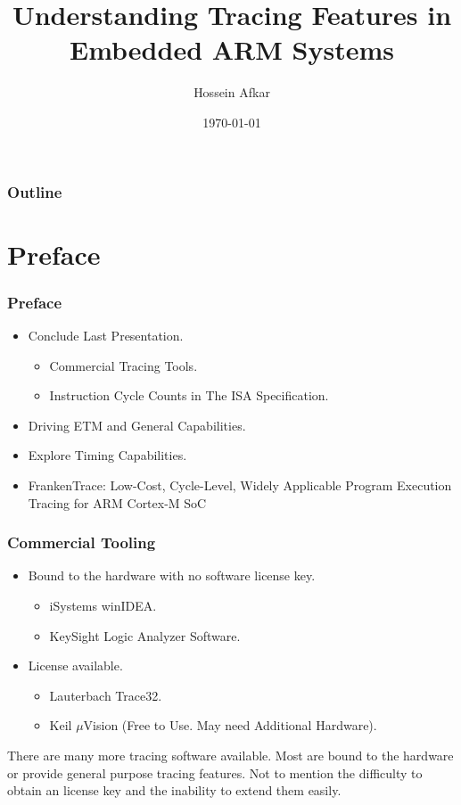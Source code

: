 \documentclass{beamer}
\title[Tracing Features in ARM]
{Understanding Tracing Features in Embedded ARM Systems}
\author[]{Hossein Afkar}
\institute{DRTS Lab}
\date{\today}
\begin{document}
\frame{\titlepage}

\begin{frame}
    \frametitle{Outline}
    \tableofcontents[hideallsubsections]
\end{frame}


\section{Preface}
\begin{frame}
    \frametitle{Preface}
    \begin{itemize}
        \item Conclude Last Presentation.
            \begin{itemize}
                \item Commercial Tracing Tools.
                \item Instruction Cycle Counts in The ISA Specification.
            \end{itemize}
        \item Driving ETM and General Capabilities.
        \item Explore Timing Capabilities.
        \item FrankenTrace: Low-Cost, Cycle-Level, Widely
            Applicable Program Execution Tracing for ARM Cortex-M SoC
    \end{itemize}
\end{frame}

\begin{frame}
    \frametitle{Commercial Tooling}
    \begin{itemize}
        \item Bound to the hardware with no software license key.
            \begin{itemize}
                \item iSystems winIDEA.
                \item KeySight Logic Analyzer Software.
            \end{itemize}
        \item License available.
            \begin{itemize}
                \item Lauterbach Trace32.
                \item Keil $\mu$Vision (Free to Use. May need Additional Hardware).
            \end{itemize}
    \end{itemize}
    There are many more tracing software available. Most are bound to the
    hardware or provide general purpose tracing features. Not to mention the
    difficulty to obtain an license key and the inability to extend them
    easily.
\end{frame}
\end{document}
